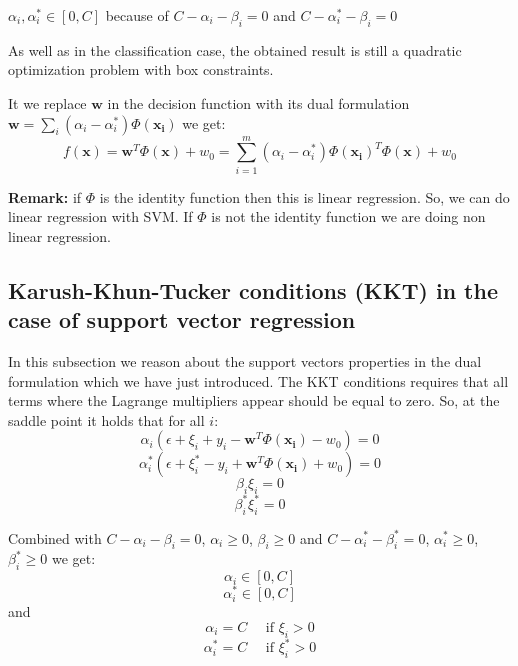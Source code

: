 $\alpha_{i}, \alpha_{i}^{*}\in [0,C]$ because of $C - \alpha_{i}- \beta_{i}= 0$ and
$C - \alpha_{i}^{*}- \beta_{i}= 0$
\newline

As well as in the classification case, the obtained result is still a quadratic optimization
problem with box constraints.
\newline

It we replace $\pmb{w}$ in the decision function with its dual formulation $\pmb{w}
= \sum_{i}(\alpha_{i}-\alpha_{i}^{*}) \Phi(\pmb{x_i})$ we get:
\[
	f(\pmb{x}) = \pmb{w}^{T}\Phi(\pmb{x}) + w_{0}= \sum_{i=1}^{m}(\alpha_{i}- \alpha
	_{i}^{*}) \Phi(\pmb{x_i})^{T}\Phi(\pmb{x}) + w_{0}
\]

\textbf{Remark:} if $\Phi$ is the identity function then this is linear
regression. So, we can do linear regression with SVM. If $\Phi$ is not the identity
function we are doing non linear regression.

\subsection{Karush-Khun-Tucker conditions (KKT) in the case of support vector
regression}
In this subsection we reason about the support vectors properties in the dual formulation
which we have just introduced. The KKT conditions requires that all terms where
the Lagrange multipliers appear should be equal to zero. So, at the saddle point
it holds that for all $i$:
\[
	\alpha_{i}(\epsilon + \xi_{i}+ y_{i}- \pmb{w}^{T}\Phi(\pmb{x_i}) - w_{0}) = 0
\]
\[
	\alpha_{i}^{*}(\epsilon + \xi_{i}^{*}- y_{i}+ \pmb{w}^{T}\Phi(\pmb{x_i}) + w_{0}
	) = 0
\]
\[
	\beta_{i}\xi_{i}= 0
\]
\[
	\beta_{i}^{*}\xi_{i}^{*}= 0
\]

Combined with $C - \alpha_{i}- \beta_{i}= 0$, $\alpha_{i}\geq 0$,
$\beta_{i}\geq 0$ and $C - \alpha_{i}^{*}- \beta_{i}^{*}= 0$, $\alpha_{i}^{*}\geq
0$, $\beta_{i}^{*}\geq 0$ we get:
\[
	\alpha_{i}\in [0,C]
\]
\[
	\alpha_{i}^{*}\in [0,C]
\]
and
\[
	\alpha_{i}= C \quad \text{ if }\xi_{i}> 0
\]
\[
	\alpha_{i}^{*}= C \quad \text{ if }\xi_{i}^{*}> 0
\]

